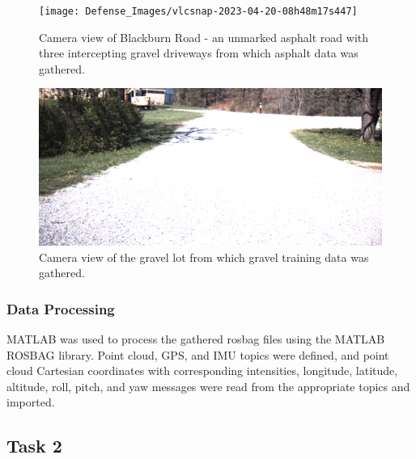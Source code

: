 \documentclass[numbered,pdftex]{ohio-etd}
\begin{document}
{{{{				%
				
				\begin{figure}[H]
					\centering
					\texttt{[image: Defense\_Images/vlcsnap-2023-04-20-08h48m17s447]}
					\caption[Blackburn Road Camera View]{Camera view of Blackburn Road - an unmarked asphalt road with three intercepting gravel driveways from which asphalt data was gathered.}
					\label{fig:Blackburn_Road_View}
				\end{figure}
				
				\begin{figure}[H]
					\centering
					\includegraphics[width=0.75\linewidth]{Defense_Images/gravel_training_lot}
					\caption[Gravel Training Lot]{Camera view of the gravel lot from which gravel training data was gathered.}
					\label{fig:gravel_training_lot}
				\end{figure}
										
			} %
				
			\subsubsection{Data Processing}\label{sec:data_processing}{

				{MATLAB was used to process the gathered rosbag files using the MATLAB ROSBAG library. Point cloud, GPS, and IMU topics were defined, and point cloud Cartesian coordinates with corresponding intensities, longitude, latitude, altitude, roll, pitch, and yaw messages were read from the appropriate topics and imported.}
		
			} %
				
		} %

		\subsection{Task 2}{

}}}
\end{document}
